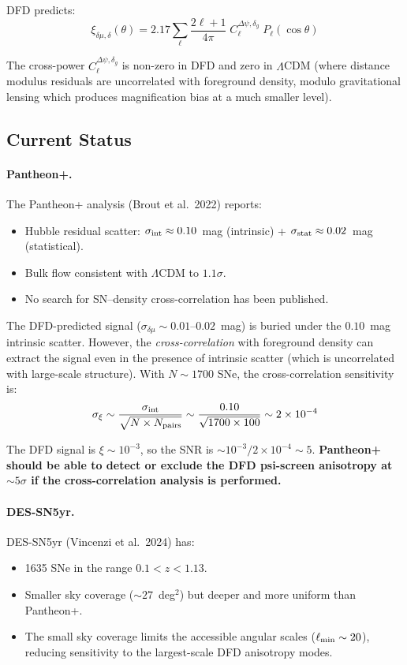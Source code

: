 \documentclass[11pt,a4paper]{article}
\newcounter{findingctr}
\newenvironment{finding}[1][]{%
  \refstepcounter{findingctr}%
  \begin{tcolorbox}[colback=blue!3!white, colframe=blue!50!black,
    title=\textbf{Finding \thefindingctr: #1}]
}{%
  \end{tcolorbox}%
}
\newcommand{\ee}[1]{\times 10^{#1}}
\newcommand{\LCDM}{$\Lambda$CDM}
\newcommand{\Dpsi}{\Delta\psi}
\begin{document}
\begin{finding}[\textbf{SNe Ia}: The Decisive Test --- Quantitative
  Predictions]
DFD predicts:
\begin{equation}
\xi_{\delta\mu,\delta}(\theta) = 2.17 \sum_\ell
\frac{2\ell+1}{4\pi}\;C_\ell^{\Dpsi,\delta_g}\;P_\ell(\cos\theta)
\end{equation}

The cross-power $C_\ell^{\Dpsi,\delta_g}$ is non-zero in DFD and
zero in \LCDM{} (where distance modulus residuals are uncorrelated
with foreground density, modulo gravitational lensing which produces
magnification bias at a much smaller level).

\subsection*{Current Status}

\paragraph{Pantheon+.}
The Pantheon+ analysis (Brout et al.\ 2022) reports:
\begin{itemize}[nosep]
\item Hubble residual scatter: $\sigma_{\rm int} \approx 0.10$~mag
  (intrinsic) + $\sigma_{\rm stat} \approx 0.02$~mag (statistical).
\item Bulk flow consistent with \LCDM{} to $1.1\sigma$.
\item No search for SN--density cross-correlation has been published.
\end{itemize}

The DFD-predicted signal ($\sigma_{\delta\mu} \sim 0.01$--$0.02$~mag)
is buried under the $0.10$~mag intrinsic scatter.  However, the
\emph{cross-correlation} with foreground density can extract the
signal even in the presence of intrinsic scatter (which is uncorrelated
with large-scale structure).  With $N \sim 1700$ SNe, the
cross-correlation sensitivity is:
\begin{equation}
\sigma_{\xi} \sim \frac{\sigma_{\rm int}}{\sqrt{N \times N_{\rm pairs}}}
\sim \frac{0.10}{\sqrt{1700 \times 100}} \sim 2\ee{-4}
\end{equation}

The DFD signal is $\xi \sim 10^{-3}$, so the SNR is
$\sim 10^{-3}/2\ee{-4} \sim 5$.  \textbf{Pantheon+ should be able
to detect or exclude the DFD psi-screen anisotropy at $\sim 5\sigma$
if the cross-correlation analysis is performed.}

\paragraph{DES-SN5yr.}
DES-SN5yr (Vincenzi et al.\ 2024) has:
\begin{itemize}[nosep]
\item 1635 SNe in the range $0.1 < z < 1.13$.
\item Smaller sky coverage ($\sim 27$~deg$^2$) but deeper and more
  uniform than Pantheon+.
\item The small sky coverage limits the accessible angular scales
  ($\ell_{\rm min} \sim 20$), reducing sensitivity to the largest-scale
  DFD anisotropy modes.
\end{itemize}


\end{finding}
\end{document}
